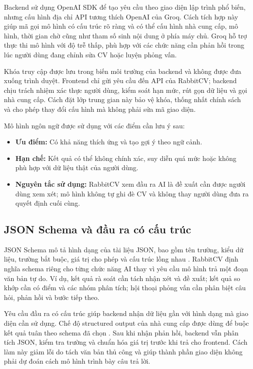 Backend sử dụng OpenAI SDK để tạo yêu cầu theo giao diện lập trình phổ biến, nhưng cấu hình địa chỉ API tương thích OpenAI của Groq. Cách tích hợp này giúp mã gọi mô hình có cấu trúc rõ ràng và có thể cấu hình nhà cung cấp, mô hình, thời gian chờ cũng như tham số sinh nội dung ở phía máy chủ. Groq hỗ trợ thực thi mô hình với độ trễ thấp, phù hợp với các chức năng cần phản hồi trong lúc người dùng đang chỉnh sửa CV hoặc luyện phỏng vấn.

Khóa truy cập được lưu trong biến môi trường của backend và không được đưa xuống trình duyệt. Frontend chỉ gửi yêu cầu đến API của RabbitCV; backend chịu trách nhiệm xác thực người dùng, kiểm soát hạn mức, rút gọn dữ liệu và gọi nhà cung cấp. Cách đặt lớp trung gian này bảo vệ khóa, thống nhất chính sách và cho phép thay đổi cấu hình mà không phải sửa mã giao diện.

Mô hình ngôn ngữ được sử dụng với các điểm cần lưu ý sau:

\begin{itemize}
    \item \textbf{Ưu điểm:} Có khả năng thích ứng và tạo gợi ý theo ngữ cảnh.
    \item \textbf{Hạn chế:} Kết quả có thể không chính xác, suy diễn quá mức hoặc không phù hợp với dữ liệu thật của người dùng.
    \item \textbf{Nguyên tắc sử dụng:} RabbitCV xem đầu ra AI là đề xuất cần được người dùng xem xét; mô hình không tự ghi đè CV và không thay người dùng đưa ra quyết định cuối cùng.
\end{itemize}

\subsection{JSON Schema và đầu ra có cấu trúc}

JSON Schema mô tả hình dạng của tài liệu JSON, bao gồm tên trường, kiểu dữ liệu, trường bắt buộc, giá trị cho phép và cấu trúc lồng nhau \cite{jsonschema}. RabbitCV định nghĩa schema riêng cho từng chức năng AI thay vì yêu cầu mô hình trả một đoạn văn bản tự do. Ví dụ, kết quả rà soát cần tách nhận xét và đề xuất; kết quả so khớp cần có điểm và các nhóm phân tích; hội thoại phỏng vấn cần phân biệt câu hỏi, phản hồi và bước tiếp theo.

Yêu cầu đầu ra có cấu trúc giúp backend nhận dữ liệu gần với hình dạng mà giao diện cần sử dụng. Chế độ structured output của nhà cung cấp được dùng để buộc kết quả tuân theo schema đã chọn \cite{groqstructured}. Sau khi nhận phản hồi, backend vẫn phân tích JSON, kiểm tra trường và chuẩn hóa giá trị trước khi trả cho frontend. Cách làm này giảm lỗi do tách văn bản thủ công và giúp thành phần giao diện không phải dự đoán cách mô hình trình bày câu trả lời.

